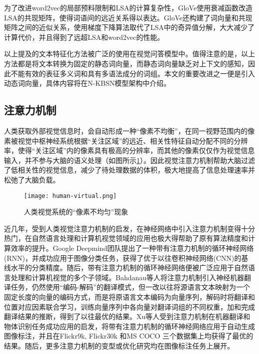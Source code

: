 为了改进word2vec的局部预料限制和LSA的计算复杂性，GloVe使用衰减函数改造LSA的共现矩阵，使得词语间的远近关系得以表达。GloVe还构建了词向量和共现矩阵之间的近似关系，使用梯度下降算法取代了LSA中的奇异值分解，大大减少了计算代价，并且得到了远超LSA和word2vec的性能。

以上提及的文本特征化方法被广泛的使用在视觉问答模型中。值得注意的是，以上方法都是将文本转换为固定的静态词向量，而静态词向量缺乏对上下文的感知，因此不能有效的表征多义词和具有多语法成分的词组。本文的重要改进之一便是引入动态词向量，具体内容将在N-KBSN模型架构中介绍。

\subsection{注意力机制}
人类获取外部视觉信息时，会自动形成一种“像素不均衡”，在同一视野范围内的像素被视觉中枢神经系统根据“关注区域”的远近、相关性特征自动分配不同的分辨率，使得“关注区域”内的像素具有极高的分辨率，而其他的像素仅仅作为视觉信息输入，并不参与大脑的语义处理（如图所示\ref{human-virtual}）。因此视觉注意力机制帮助大脑过滤了低相关性的视觉信息，减少了待处理数据的体积，极大地提高了信息处理速率并松弛了大脑负载。
\begin{figure}[H]
	\centering
	\texttt{[image: human-virtual.png]}
	\caption{人类视觉系统的“像素不均匀”现象}
	\label{human-virtual}
\end{figure}

近几年，受到人类视觉注意力机制的启发，在神经网络中引入注意力机制变得十分热门，在自然语言处理和计算机视觉领域的应用也极大得帮助了原有算法精度和计算效率的提升。Google Deepmind团队提出了一种带有注意力机制的循环神经网络(RNN)，并成功应用于图像分类任务，获得了优于以往卷积神经网络(CNN)的基线水平的分类精度。随后，带有注意力机制的循环神经网络便被广泛应用于自然语言处理和计算机视觉的多个子领域。Bahdanau等人将注意力机制引入神经机器翻译任务，仍然使用“编码-解码”的翻译模式，但一改以往将源语言文本映射为一个固定长度的向量的编码方式，而是将原语言文本编码为向量序列，解码时将翻译和位置对应因素联合学习，训练向量序列中各向量对翻译词组的不同权重，加和完成翻译结果的推断，得到了以往最优的结果。Xu等人受到注意力机制在机器翻译和物体识别任务成功应用的启发，将带有注意力机制的循环神经网络应用于自动生成图像标注，并且在Flickr9k, Flickr30k 和MS COCO 三个数据集上均获得了最优的结果。随后，更多注意力机制的变型或优化研究均在图像标注任务上展开。

